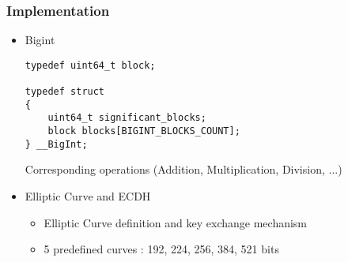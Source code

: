 \begin{frame}[fragile]
\frametitle{Implementation}
\begin{itemize}
\setlength\itemsep{1.5em}
\item{Bigint
\begin{lstlisting}[frame=single, basicstyle=\scriptsize]
typedef uint64_t block;

typedef struct 
{
    uint64_t significant_blocks;    
    block blocks[BIGINT_BLOCKS_COUNT]; 
} __BigInt;
\end{lstlisting}
Corresponding operations (Addition, Multiplication, Division, ...)
}
\item{Elliptic Curve and ECDH
\begin{itemize}
\item{Elliptic Curve definition and key exchange mechanism}
\item{5 predefined curves : 192, 224, 256, 384, 521 bits}
\end{itemize}
}
\end{itemize}

\end{frame}